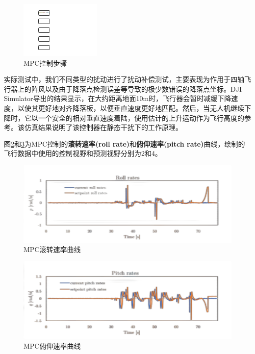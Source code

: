 \begin{figure}[ht]
  \centering
  \includegraphics[width=0.8\linewidth]{./Figure/MPC_Control_Steps.png}
  \caption{MPC控制步骤}\label{Fig:img16_add}
\end{figure}

实际测试中，我们不同类型的扰动进行了扰动补偿测试，主要表现为作用于四轴飞行器上的阵风以及由于降落点检测误差等导致的极少数错误的降落点坐标。DJI Simulator导出的结果显示，在大约距离地面10m时，飞行器会暂时减缓下降速度，以使其更好地对齐降落板，以便垂直速度更好地匹配。然后，当无人机继续下降时，它以一个安全的相对垂直速度着陆，使用估计的上升运动作为飞行高度的参考。该仿真结果说明了该控制器在静态干扰下的工作原理。

图\ref{Fig:img17}和\ref{Fig:img18}为MPC控制的\textbf{滚转速率(roll rate)}和\textbf{俯仰速率(pitch rate)}曲线，绘制的飞行数据中使用的控制视野和预测视野分别为2和4。

\begin{figure}[ht]
  \centering
  \includegraphics[width=0.8\linewidth]{./Figure/MPC-Roll-Rates.png}
  \caption{MPC滚转速率曲线}\label{Fig:img17}
\end{figure}

\begin{figure}[ht]
  \centering
  \includegraphics[width=0.8\linewidth]{./Figure/MPC-Pitch-Rates.png}
  \caption{MPC俯仰速率曲线}\label{Fig:img18}
\end{figure}

